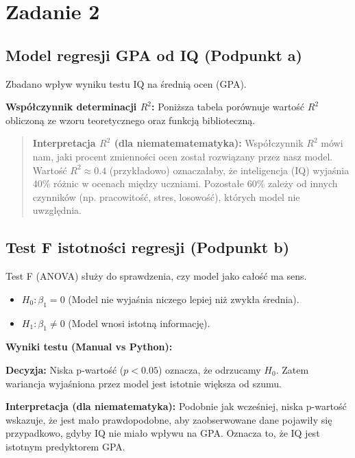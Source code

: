 \documentclass[12pt, a4paper]{article}
\begin{document}
\FloatBarrier

\section{Zadanie 2}

\subsection{Model regresji GPA od IQ (Podpunkt a)}
Zbadano wpływ wyniku testu IQ na średnią ocen (GPA).

\textbf{Współczynnik determinacji $R^2$:}
Poniższa tabela porównuje wartość $R^2$ obliczoną ze wzoru teoretycznego oraz funkcją biblioteczną.


\begin{quote}
    \textbf{Interpretacja $R^2$ (dla niematematematyka):}
    Współczynnik $R^2$ mówi nam, jaki procent zmienności ocen został rozwiązany przez nasz model.
    Wartość $R^2 \approx 0.4$ (przykładowo) oznaczałaby, że inteligencja (IQ) wyjaśnia 40\% różnic w ocenach między uczniami. Pozostałe 60\% zależy od innych czynników (np. pracowitość, stres, losowość), których model nie uwzględnia.
\end{quote}

\subsection{Test F istotności regresji (Podpunkt b)}
Test F (ANOVA) służy do sprawdzenia, czy model jako całość ma sens.
\begin{itemize}
    \item $H_0: \beta_1 = 0$ (Model nie wyjaśnia niczego lepiej niż zwykła średnia).
    \item $H_1: \beta_1 \neq 0$ (Model wnosi istotną informację).
\end{itemize}

\textbf{Wyniki testu (Manual vs Python):}


\textbf{Decyzja:}
Niska p-wartość ($p < 0.05$) oznacza, że odrzucamy $H_0$. Zatem wariancja wyjaśniona przez model jest istotnie większa od szumu.

\textbf{Interpretacja (dla niematematyka):}
Podobnie jak wcześniej, niska p-wartość wskazuje, że jest mało prawdopodobne, aby zaobserwowane dane pojawiły się przypadkowo, gdyby IQ nie miało wpływu na GPA. Oznacza to, że IQ jest istotnym predyktorem GPA.
\end{document}
